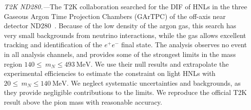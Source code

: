 \documentclass[
reprint,
superscriptaddress,
showpacs,
preprintnumbers,
bibnotes,
amsmath,
amssymb,
aps,
prd,
floatfix
]{revtex4-2}
\begin{document}
\emph{T2K ND280.---}The T2K collaboration searched for the DIF of HNLs in the three Gaseous Argon Time Projection Chambers (GArTPC) of the off-axis near detector ND280~\cite{Abe:2019kgx}.
Because of the low density of the argon gas, this search has very small backgrounds from neutrino interactions, while the gas allows excellent tracking and identification of the $e^+e^-$ final state.
The analysis observes no event in all analysis channels, and provides some of the strongest limits in the mass region $\SI{140} \leq ~ m_N \leq \SI{493}\MeV$.
We use their null results and extrapolate the experimental efficiencies to estimate the constraint on light HNLs with $\SI{20} \leq ~ m_N \leq \SI{140} \MeV$.
We neglect systematic uncertainties and backgrounds, as they provide negligible contributions to the limits.
We reproduce the official T2K result above the pion mass with reasonable accuracy.
\end{document}
